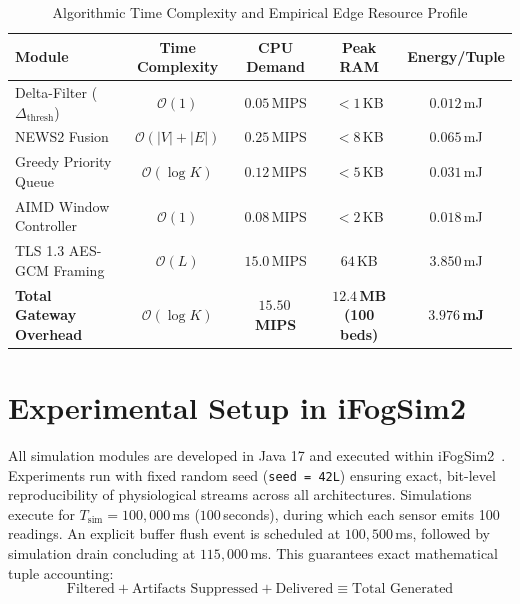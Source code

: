 \documentclass[conference]{IEEEtran}
\begin{document}
\begin{table}[htbp]
\centering
\caption{Algorithmic Time Complexity and Empirical Edge Resource Profile}
\label{tab:complexity}
\begin{tabular}{lcccc}
\toprule
\textbf{Module} & \textbf{Time Complexity} & \textbf{CPU Demand} & \textbf{Peak RAM} & \textbf{Energy/Tuple} \\
\midrule
Delta-Filter ($\Delta_{\text{thresh}}$) & $\mathcal{O}(1)$ & $0.05$\,MIPS & $< 1$\,KB & $0.012$\,mJ \\
NEWS2 Fusion & $\mathcal{O}(|V| + |E|)$ & $0.25$\,MIPS & $< 8$\,KB & $0.065$\,mJ \\
Greedy Priority Queue & $\mathcal{O}(\log K)$ & $0.12$\,MIPS & $< 5$\,KB & $0.031$\,mJ \\
AIMD Window Controller & $\mathcal{O}(1)$ & $0.08$\,MIPS & $< 2$\,KB & $0.018$\,mJ \\
TLS 1.3 AES-GCM Framing & $\mathcal{O}(L)$ & $15.0$\,MIPS & $64$\,KB & $3.850$\,mJ \\
\midrule
\textbf{Total Gateway Overhead} & $\mathcal{O}(\log K)$ & $\mathbf{15.50}$\,\textbf{MIPS} & $\mathbf{12.4}$\,\textbf{MB (100 beds)} & $\mathbf{3.976}$\,\textbf{mJ} \\
\bottomrule
\end{tabular}
\end{table}

\section{Experimental Setup in iFogSim2}
All simulation modules are developed in Java 17 and executed within iFogSim2~\cite{Mahmud2022}. Experiments run with fixed random seed (\texttt{seed = 42L}) ensuring exact, bit-level reproducibility of physiological streams across all architectures. Simulations execute for $T_{\text{sim}} = 100{,}000$\,ms ($100$\,seconds), during which each sensor emits 100 readings. An explicit buffer flush event is scheduled at $100{,}500$\,ms, followed by simulation drain concluding at $115{,}000$\,ms. This guarantees exact mathematical tuple accounting:
\begin{equation}
\text{Filtered} + \text{Artifacts Suppressed} + \text{Delivered} \equiv \text{Total Generated}
\end{equation}
\end{document}
